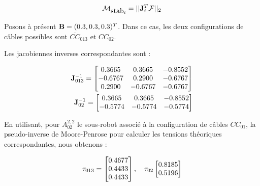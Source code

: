 \begin{equation}
\mathcal M_{\hbox{stab}_i} = ||{\bf J}^T_i {\boldmath {\mathcal F}}||_2
\label{chap03:eq07}
\end{equation}

Posons à présent ${\bf B} = (0.3,0.3,0.3)^T$. Dans ce cas, les deux 
configurations de câbles possibles sont $\overline{CC}_{013}$ et $CC_{02}$.

Les jacobiennes inverses correspondantes sont :

\begin{equation}
\begin{split}
{\bf J}^{-1}_{013} = 
\begin{bmatrix}
0.3665 & 0.3665 & -0.8552 \\  
-0.6767 & 0.2900 & -0.6767 \\  
0.2900 & -0.6767 & -0.6767
\end{bmatrix} \\
{\bf J}^{-1}_{02} = 
\begin{bmatrix}
0.3665 & 0.3665 & -0.8552 \\  
-0.5774 & -0.5774 & -0.5774
\end{bmatrix}
\end{split}
\label{chap03:eq08}
\end{equation}

En utilisant, pour $A^{2,2}_{02}$ le sous-robot associé à la configuration de 
câbles $CC_{01}$, la pseudo-inverse de Moore-Penrose pour calculer les tensions 
théoriques correspondantes, nous obtenons :

\begin{equation}
{\bf \tau}_{013} = 
\begin{bmatrix}
0.4677 \\
0.4433 \\
0.4433
\end{bmatrix},
\quad
{\bf \tau}_{02}
\begin{bmatrix}
0.8185 \\ 
0.5196 
\end{bmatrix}
\label{chap03:eq09}
\end{equation}

